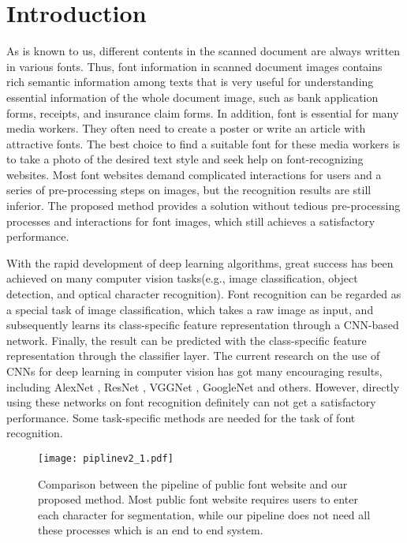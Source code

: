 \documentclass[manuscript,screen]{acmart}
\begin{document}


\maketitle

\section{Introduction}
As is known to us, different contents in the scanned document are always written in various fonts. Thus, font information in scanned document images contains rich semantic information among texts that is very useful for understanding essential information of the whole document image, such as bank application forms, receipts, and insurance claim forms. In addition, font is essential for many media workers. They often need to create a poster or write an article with attractive fonts. The best choice to find a suitable font for these media workers is to take a photo of the desired text style and seek help on font-recognizing websites. Most font websites demand complicated interactions for users and a series of pre-processing steps on images, but the recognition results are still inferior. The proposed method provides a solution without tedious pre-processing processes and interactions for font images, which still achieves a satisfactory performance.

With the rapid development of deep learning algorithms, great success has been achieved on many computer vision tasks(e.g., image classification, object detection, and optical character recognition). Font recognition can be regarded as a special task of image classification, which takes a raw image as input, and subsequently learns its class-specific feature representation through a CNN-based network. Finally, the result can be predicted with the class-specific feature representation through the classifier layer. The current research on the use of CNNs for deep learning in computer vision has got many encouraging results, including AlexNet \cite{krizhevsky_imagenet_2017} , ResNet \cite{he2016deep} , VGGNet \cite{simonyan_very_2015} , GoogleNet \cite{Szegedy_2015_CVPR} and others. However, directly using these networks on font recognition definitely can not get a satisfactory performance. Some task-specific methods are needed for the task of font recognition.

\begin{figure}[ht]
\centering
\texttt{[image: piplinev2\_1.pdf]}
\caption{Comparison between the pipeline of public font website and our proposed method. Most public font website requires users to enter each character for segmentation, while our pipeline does not need all these processes which is an end to end system.}
\label{fig1}
\end{figure}
\end{document}
